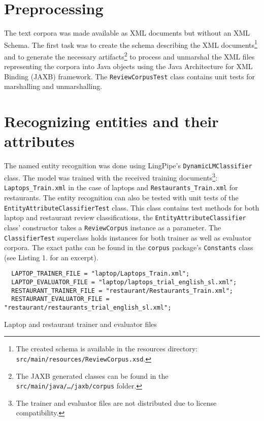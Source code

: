 \section*{Preprocessing}
The text corpora was made available as XML documents but without an XML Schema.
The first task was to create the schema describing the XML
documents\footnote{The created schema is available in the resources directory:
\texttt{src/main/resources/ReviewCorpus.xsd}.} and to generate the necessary
artifacts\footnote{The JAXB generated classes can be found in the
\texttt{src/main/java/\ldots/jaxb/corpus} folder.} to process and unmarshal
the XML files representing the corpora into Java objects using the Java
Architecture for XML Binding (JAXB)\cite{JAXB} framework. The
\verb|ReviewCorpusTest| class contains unit tests for marshalling and
unmarshalling.

\section*{Recognizing entities and their attributes}
The named entity recognition was done using LingPipe's
\verb|DynamicLMClassifier| class. The model was trained with the received
training documents\footnote{The trainer and evaluator files are not distributed
due to license compatibility.}: \texttt{Laptops\_Train.xml} in the case of
laptops and \texttt{Restaurants\_Train.xml} for restaurants.
The entity recognition can also be tested with unit tests of the
\verb|EntityAttributeClassifierTest| class. This class
contains test methods for both laptop and restaurant review classifications,
the \texttt{EntityAttributeClassifier} class' constructor takes a
\texttt{ReviewCorpus} instance as a parameter. The \texttt{ClassifierTest}
superclass holds instances for both trainer as well as evaluator corpora. The
exact paths can be found in the \texttt{corpus} package's \texttt{Constants}
class (see Listing 1. for an excerpt).

\begin{listing}
\begin{verbatim}
  LAPTOP_TRAINER_FILE = "laptop/Laptops_Train.xml";
  LAPTOP_EVALUATOR_FILE = "laptop/laptops_trial_english_sl.xml";
  RESTAURANT_TRAINER_FILE = "restaurant/Restaurants_Train.xml";
  RESTAURANT_EVALUATOR_FILE = "restaurant/restaurants_trial_english_sl.xml";
\end{verbatim}
\caption[Laptop and restaurant trainer and evaluator files]{Laptop and
restaurant trainer and evaluator files\footnotemark}
\label{listing:constants}
\end{listing}

